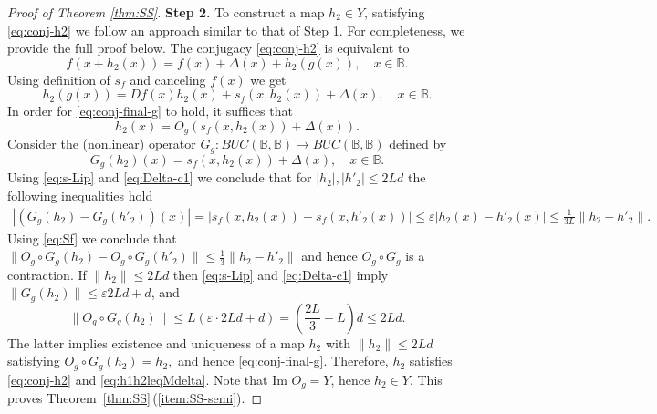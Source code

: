 \documentclass[12pt]{article}
\newcommand{\Bb}{\mathbb{B}}
\theoremstyle{definition}
\begin{document}
\begin{proof}[Proof of Theorem \ref{thm:SS}]
\textbf{Step 2.} To construct a map $h_2 \in Y$, satisfying \eqref{eq:conj-h2} we follow an approach similar to that of Step 1. For completeness, we provide the full proof below. 
The conjugacy \eqref{eq:conj-h2} 
    is equivalent to
    $$
    f(x+h_2(x)) = f(x) + \Delta(x) + h_2(g(x)), \quad x \in \Bb.
    $$
    Using definition of $s_f$ and canceling $f(x)$ we get
\begin{equation}\label{eq:conj-final-g}
        h_2(g(x)) = Df(x)h_2(x) + s_f(x, h_2(x)) + \Delta(x), \quad x \in \Bb.    
\end{equation}
In order for \eqref{eq:conj-final-g} to hold, it suffices that
\begin{equation}
    h_2(x) = O_g(s_f(x, h_2(x)) + \Delta(x)).
\end{equation}    
Consider the (nonlinear) operator $G_g:BUC(\Bb, \Bb) \to BUC(\Bb, \Bb)$ defined by
$$
G_g(h_2)(x) = s_f(x, h_2(x)) + \Delta(x), \quad x \in \Bb.
$$
Using \eqref{eq:s-Lip} and \eqref{eq:Delta-c1} we conclude that for $|h_2|, |h'_2| \leq 2L d$ the following inequalities hold 
\begin{multline*}
|(G_g(h_2)-G_g(h'_2))(x)| = |s_f(x, h_2(x)) - s_f(x, h'_2(x))| \leq 
\varepsilon|h_2(x) - h'_2(x)| \leq \frac{1}{3L}\|h_2 - h'_2\|.   
\end{multline*}
Using \eqref{eq:Sf} we conclude that 
$
\|O_g \circ G_g(h_2) - O_g \circ G_g(h'_2)\| \leq \frac{1}{3}\|h_2-h'_2\|
$
and hence $O_g \circ G_g$ is a contraction. If $\|h_2\| \leq 2Ld$ then  \eqref{eq:s-Lip} and \eqref{eq:Delta-c1} imply $\|G_g(h_2)\| \leq \varepsilon 2Ld + d$, and 
$$
\|O_g \circ G_g(h_2)\| \leq L(\varepsilon \cdot 2Ld + d)  = \left(\frac{2L}{3}+L\right)d \leq 2Ld.
$$
The latter implies existence and uniqueness of a map $h_2$ with $\|h_2\| \leq 2Ld$ satisfying
$
O_g \circ G_g (h_2) = h_2,
$
and hence \eqref{eq:conj-final-g}. Therefore, $h_2$ satisfies \eqref{eq:conj-h2} and \eqref{eq:h1h2leqMdelta}.  
Note that $\mbox{Im }O_g = Y$, hence $h_2 \in Y$. This proves Theorem~\ref{thm:SS}\,(\ref{item:SS-semi}).


\end{proof}
\end{document}
